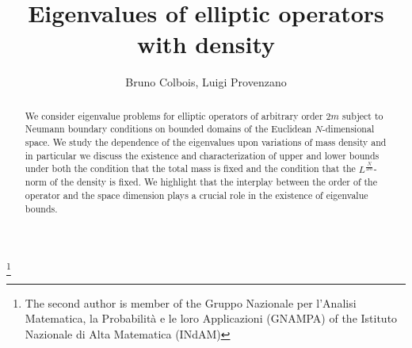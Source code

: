 \documentclass[11pt,a4paper]{amsart}
\numberwithin{equation}{section}
\begin{document}
\title[Eigenvalues of elliptic operators with density]
{Eigenvalues of elliptic operators with density}

\author{Bruno Colbois, Luigi Provenzano}

\address{Bruno Colbois, Laboratoire de Math\'ematiques, Universit\'e de Neuch\^atel, 13 Rue E. Argand, 2007 Neuch\^atel, Switzerland. {\it E-mail}: {\rm bruno.colbois@unine.ch}}

\address{Luigi Provenzano, EPFL, SB Institute of Mathematics, Station 8, CH-1015 Lausanne, Switzerland. {\it E-mail}: {\rm luigi.provenzano@epfl.ch}}





 

 
 
 
 \thanks{The second author is member of the Gruppo Nazionale per l'Analisi Matematica, la Probabilit\`a e le loro Applicazioni (GNAMPA) of the Istituto Nazionale di Alta Matematica (INdAM)}





\begin{abstract}
We consider eigenvalue problems for elliptic operators of arbitrary order $2m$ subject to Neumann boundary conditions on bounded domains of the Euclidean $N$-dimensional space. We study the dependence of the eigenvalues upon variations of mass density and in particular we discuss the existence and characterization of upper and lower bounds under both the condition that the total mass is fixed and the condition that the $L^{\frac{N}{2m}}$-norm of the density is fixed. We highlight that the interplay between the order of the operator and the space dimension plays a crucial role in the existence of eigenvalue bounds.
\end{abstract}
\maketitle


\end{document}
